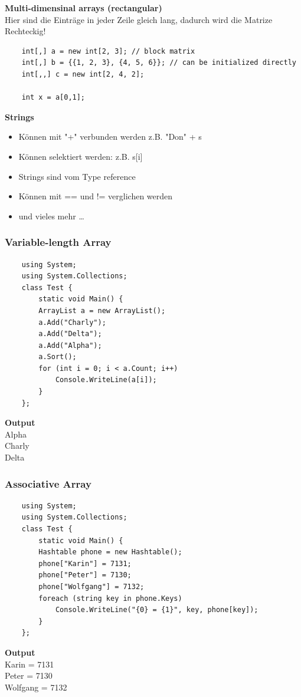 \textbf{Multi-dimensinal arrays (rectangular)}\\
Hier sind die Einträge in jeder Zeile gleich lang, dadurch wird die Matrize Rechteckig!
\begin{lstlisting}
	int[,] a = new int[2, 3]; // block matrix 
	int[,] b = {{1, 2, 3}, {4, 5, 6}}; // can be initialized directly 
	int[,,] c = new int[2, 4, 2];
	
	int x = a[0,1];
\end{lstlisting}

\textbf{Strings}
\begin{itemize}
	\item Können mit "+" verbunden werden z.B. "Don" + s
	\item Können selektiert werden: z.B. s[i]
	\item Strings sind vom Type reference
	\item Können mit == und != verglichen werden
	\item und vieles mehr \ldots
\end{itemize}

\subsubsection{Variable-length Array}
\begin{multicols}{2}

	\begin{lstlisting}
	using System;
	using System.Collections;
	class Test {
		static void Main() {
		ArrayList a = new ArrayList();
		a.Add("Charly");
		a.Add("Delta");
		a.Add("Alpha");
		a.Sort();
		for (int i = 0; i < a.Count; i++)
			Console.WriteLine(a[i]);
		}
	};
	\end{lstlisting}
	\columnbreak
	
	\textbf{Output}\\
		Alpha\\
		Charly\\
		Delta\\
\end{multicols}


\subsubsection{Associative Array}
\begin{multicols}{2}

	\begin{lstlisting}
	using System;
	using System.Collections;
	class Test {
		static void Main() {
		Hashtable phone = new Hashtable();
		phone["Karin"] = 7131;
		phone["Peter"] = 7130;
		phone["Wolfgang"] = 7132;
		foreach (string key in phone.Keys)
			Console.WriteLine("{0} = {1}", key, phone[key]);
		}
	};
	\end{lstlisting}
	\columnbreak
	
	\textbf{Output}\\
		Karin = 7131\\
		Peter = 7130\\
		Wolfgang = 7132\\
\end{multicols}


